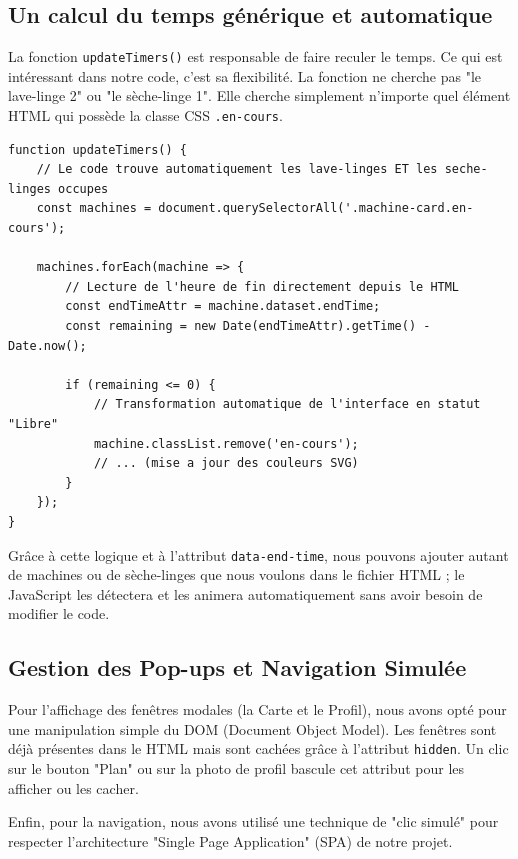 \date{}\documentclass[12pt,a4paper]{article}
\begin{document}
\subsection*{Un calcul du temps générique et automatique}
La fonction \texttt{updateTimers()} est responsable de faire reculer le temps. Ce qui est intéressant dans notre code, c'est sa flexibilité. La fonction ne cherche pas "le lave-linge 2" ou "le sèche-linge 1". Elle cherche simplement n'importe quel élément HTML qui possède la classe CSS \texttt{.en-cours}. 

\begin{lstlisting}[caption={Extrait de la fonction de mise à jour du temps}]
function updateTimers() {
    // Le code trouve automatiquement les lave-linges ET les seche-linges occupes
    const machines = document.querySelectorAll('.machine-card.en-cours');

    machines.forEach(machine => {
        // Lecture de l'heure de fin directement depuis le HTML
        const endTimeAttr = machine.dataset.endTime;
        const remaining = new Date(endTimeAttr).getTime() - Date.now();

        if (remaining <= 0) {
            // Transformation automatique de l'interface en statut "Libre"
            machine.classList.remove('en-cours');
            // ... (mise a jour des couleurs SVG)
        }
    });
}
\end{lstlisting}

Grâce à cette logique et à l'attribut \texttt{data-end-time}, nous pouvons ajouter autant de machines ou de sèche-linges que nous voulons dans le fichier HTML ; le JavaScript les détectera et les animera automatiquement sans avoir besoin de modifier le code.

\subsection*{Gestion des Pop-ups et Navigation Simulée}
Pour l'affichage des fenêtres modales (la Carte et le Profil), nous avons opté pour une manipulation simple du DOM (Document Object Model). Les fenêtres sont déjà présentes dans le HTML mais sont cachées grâce à l'attribut \texttt{hidden}. Un clic sur le bouton "Plan" ou sur la photo de profil bascule cet attribut pour les afficher ou les cacher.

Enfin, pour la navigation, nous avons utilisé une technique de "clic simulé" pour respecter l'architecture "Single Page Application" (SPA) de notre projet. 

\newpage
\end{document}
